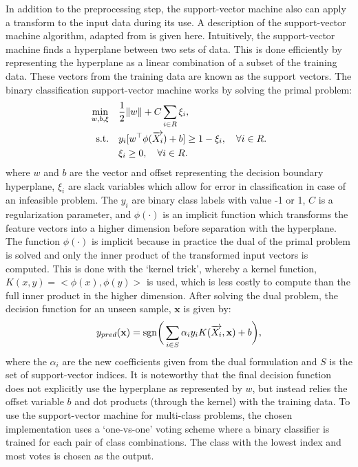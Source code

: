 In addition to the preprocessing step, the support-vector machine also can apply a transform to the 
input data during its use. A description of the support-vector machine algorithm, 
 adapted from \cite{smola2004tutorial} is given here.
Intuitively, the support-vector machine finds a hyperplane between two sets of data. This 
is done efficiently by representing the hyperplane as a linear combination of a subset of the 
training data. These vectors from the training data are known as the support vectors.
The binary classification support-vector machine works by solving the primal problem:
\begin{align}
\min_{w, b, \xi} \quad & \frac{1}{2} \|w\| + C \sum_{i\in R} \xi_i, \\
\mathrm{s.t.} \quad & y_i [w^\top \phi(\overrightarrow{X_i}) + b] \geq 1 - \xi_i, \quad \forall i \in R.\\
                 & \xi_i \geq 0, \quad \forall i \in R.
\end{align}
where $w$ and $b$ are the vector and offset representing the decision boundary hyperplane,
$\xi_i$ are slack variables which allow for error in classification in case of an infeasible problem.
The $y_i$ are binary class labels with value -1 or 1, $C$ is a regularization parameter, 
and $\phi(\cdot)$ is an implicit function which transforms the feature vectors into a higher dimension
before separation with the hyperplane. The function $\phi(\cdot)$ is implicit because in practice 
the dual of the primal problem is solved and only the inner product of the transformed input vectors 
is computed. This is done with the `kernel trick', whereby a kernel function, $K(x,y)=<\phi(x), \phi(y)>$
is used, which is less costly to compute than the full inner product in the higher dimension. After solving
the dual problem, the decision function for an unseen sample, $\mathbf{x}$ is given by:
\begin{align}
y_{pred}(\mathbf{x}) = \mathrm{sgn} \bigg( \sum_{i \in S} \alpha_i y_i K(\overrightarrow{X_i}, \mathbf{x}) + b \bigg),
\end{align}
where the $\alpha_i$ are the new coefficients given from the dual formulation 
 and $S$ is the set of support-vector indices. 
It is noteworthy that the final decision function does not explicitly use the hyperplane
 as represented by $w$, but instead relies the offset variable $b$ 
 and dot products (through the kernel) with the training data.
To use the support-vector machine for multi-class problems, the chosen implementation
 uses a `one-vs-one' voting scheme where a binary classifier is trained for each pair of
 class combinations. The class with the lowest index and most votes is chosen as the output.

